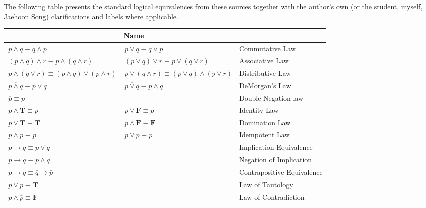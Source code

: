 The following table presents the standard logical equivalences from these sources together with 
the author's own (or the student, myself, Jaehoon Song) clarifications and labels where applicable.


\begin{table}[h!]
  \centering
  \renewcommand{\arraystretch}{1.2}
  \setlength{\tabcolsep}{8pt}
  \begin{tabular}{|p{5.0cm}|p{5.0cm}|p{5.2cm}|}
    \hline
    \rowcolor[HTML]{E0E0E0}
    \multicolumn{2}{|l|}{\textbf{Logical Equivalences}} & \textbf{Name} \\
    \hline
    $\,p \wedge q \equiv q \wedge p$ & $\,p \vee q \equiv q \vee p$ & Commutative Law \\
    \hline
    $\, (p \wedge q) \wedge r \equiv p \wedge (q \wedge r)$ & $\, (p \vee q) \vee r \equiv p \vee (q \vee r)$ & Associative Law \\
    \hline
    $\,p \wedge (q \vee r) \equiv (p \wedge q) \vee (p \wedge r)$ & $\,p \vee (q \wedge r) \equiv (p \vee q) \wedge (p \vee r)$ & Distributive Law \\
    \hline
    $\,\overline{p \wedge q} \equiv \bar{p} \vee \bar{q}$ & $\,\overline{p \vee q} \equiv \bar{p} \wedge \bar{q}$ & DeMorgan's Law \\
    \hline
    \multicolumn{2}{|l|}{$\,\overline{\overline{p}} \equiv p$} & Double Negation law \\
    \hline
    $\,p \wedge \boldsymbol{T} \equiv p$ & $\,p \vee \boldsymbol{F} \equiv p$ & Identity Law \\
    \hline
    $\,p \vee \boldsymbol{T} \equiv \boldsymbol{T}$ & $\,p \wedge \boldsymbol{F} \equiv \boldsymbol{F}$ & Domination Law \\
    \hline
    $\,p \wedge p \equiv p$ & $\,p \vee p \equiv p$ & Idempotent Law \\
    \hline
    \multicolumn{2}{|l|}{$\,p \rightarrow q \equiv \bar{p} \vee q$} & Implication Equivalence \\
    \hline
    \multicolumn{2}{|l|}{$\,\overline{p \rightarrow q} \equiv p \wedge \bar{q}$} & Negation of Implication \\
    \hline
    \multicolumn{2}{|l|}{$\,p \rightarrow q \equiv \bar{q} \rightarrow \bar{p}$} & Contrapositive Equivalence \\
    \hline
    \multicolumn{2}{|l|}{$\,p \vee \bar{p} \equiv \boldsymbol{T}$} & Law of Tautology \\
    \hline
    \multicolumn{2}{|l|}{$\,p \wedge \bar{p} \equiv \boldsymbol{F}$} & Law of Contradiction \\
    \hline
  \end{tabular}
\end{table}


